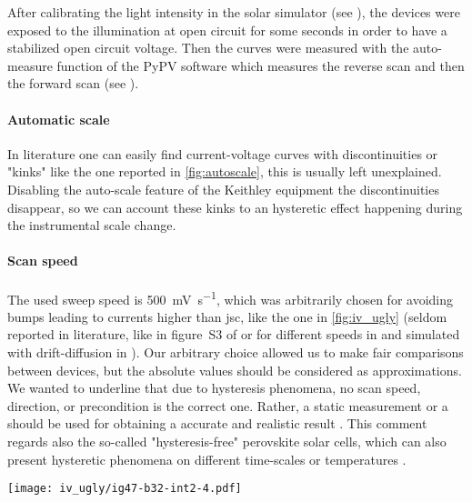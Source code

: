 	After calibrating the light intensity in the solar simulator (see ), the devices were exposed to the illumination at open circuit for some seconds in order to have a stabilized open circuit voltage.
	Then the curves were measured with the auto-measure function of the PyPV software which measures the reverse scan and then the forward scan (see ).

	\paragraph{Automatic scale}\label{autoscale}
	In literature one can easily find current\hyp{}voltage curves with discontinuities or "kinks" \cite{Li2016,Snaith2014,Zhang2015} like the one reported in \cref{fig:autoscale}, this is usually left unexplained.
	Disabling the auto-scale feature of the Keithley equipment the discontinuities disappear, so we can account these kinks to an hysteretic effect happening during the instrumental scale change.



	\paragraph{Scan speed}
	The used sweep speed is \SI{500}{\mV\per\s}, which was arbitrarily chosen for avoiding bumps leading to currents higher than \gls{jsc}, like the one in \cref{fig:iv_ugly} (seldom reported in literature, like in figure~S3 of \cite{Du2018} or for different speeds in \cite{CorreaBaena2015,Tress2015,Unger2014} and simulated with drift-diffusion in \cite{Walter2018}).
	Our arbitrary choice allowed us to make fair comparisons between devices, but the absolute values should be considered as approximations.
	We wanted to underline that due to hysteresis phenomena, no scan speed, direction, or precondition is the correct one.
	Rather, a static measurement or a  should be used for obtaining a accurate and realistic result \cite{Zimmermann2016}.
	This comment regards also the so-called "hysteresis-free" perovskite solar cells, which can also present hysteretic phenomena on different time\hyp{}scales \cite{Jacobs2018,Du2018} or temperatures \cite{Bryant2015}.
	
	\begin{SCfigure}%
	\centering
	\texttt{[image: iv\_ugly/ig47-b32-int2-4.pdf]}
	\label{fig:iv_ugly}
\end{SCfigure}

